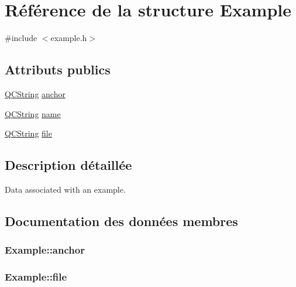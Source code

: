 \hypertarget{struct_example}{}\section{Référence de la structure Example}
\label{struct_example}


{\ttfamily \#include $<$example.\+h$>$}

\subsection*{Attributs publics}
\begin{DoxyCompactItemize}
\item 
\hyperlink{class_q_c_string}{Q\+C\+String} \hyperlink{struct_example_ad77c6c2bbf3a3cd277ee24df5a3d6190}{anchor}
\item 
\hyperlink{class_q_c_string}{Q\+C\+String} \hyperlink{struct_example_a3ff74d2063cc9dc8b836ce95e79af75d}{name}
\item 
\hyperlink{class_q_c_string}{Q\+C\+String} \hyperlink{struct_example_a5641a1748c9b207ca684c70d8183a7d8}{file}
\end{DoxyCompactItemize}


\subsection{Description détaillée}
Data associated with an example. 

\subsection{Documentation des données membres}
\hypertarget{struct_example_ad77c6c2bbf3a3cd277ee24df5a3d6190}{}
\subsubsection[{anchor}]{ Example\+::anchor}\label{struct_example_ad77c6c2bbf3a3cd277ee24df5a3d6190}
\hypertarget{struct_example_a5641a1748c9b207ca684c70d8183a7d8}{}
\subsubsection[{file}]{ Example\+::file}\label{struct_example_a5641a1748c9b207ca684c70d8183a7d8}
\hypertarget{struct_example_a3ff74d2063cc9dc8b836ce95e79af75d}{}
